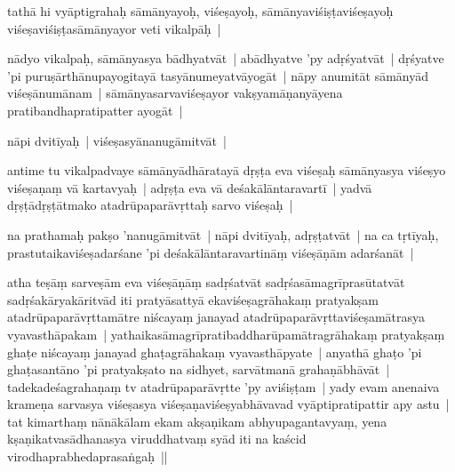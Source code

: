 \documentclass[article,12pt,a4paper]{memoir}%
\newcounter{parCount}
\begin{document}
	  
	  \pstart \leavevmode%
	\label{thakur75-73.25}tathā hi vyāptigrahaḥ sāmānyayoḥ, viśeṣayoḥ, sāmānyaviśiṣṭaviśeṣayoḥ viśeṣaviśiṣṭasāmānyayor veti vikalpāḥ |
	{}
	\pend%
      

	  
	  \pstart \leavevmode%
	\label{thakur75-73.27}nādyo vikalpaḥ, sāmānyasya bādhyatvāt | abādhyatve 'py adṛśyatvāt | dṛśyatve 'pi puruṣārthānupayogitayā tasyānumeyatvāyogāt | nāpy anumitāt sāmānyād viśeṣānumānam | sāmānyasarvaviśeṣayor vakṣyamāṇanyāyena pratibandhapratipatter ayogāt |
	{}
	\pend%
      

	  
	  \pstart \leavevmode%
	\label{thakur75-74.1}nāpi dvitīyaḥ | viśeṣasyānanugāmitvāt |
	{}
	\pend%
      

	  
	  \pstart \leavevmode%
	\label{thakur75-74.2}antime tu vikalpadvaye sāmānyādhāratayā dṛṣṭa eva viśeṣaḥ sāmānyasya viśeṣyo viśeṣaṇaṃ vā kartavyaḥ | adṛṣṭa eva vā deśakālāntaravartī | yadvā dṛṣṭādṛṣṭātmako atadrūpaparāvṛttaḥ sarvo viśeṣaḥ |
	{}
	\pend%
      

	  
	  \pstart \leavevmode%
	\label{thakur75-74.5}na prathamaḥ pakṣo 'nanugāmitvāt | nāpi dvitīyaḥ, adṛṣṭatvāt | na ca tṛtīyaḥ, prastutaikaviśeṣadarśane 'pi deśakālāntaravartināṃ viśeṣāṇām adarśanāt |
	{}
	\pend%
      

	  
	  \pstart \leavevmode%
	\label{thakur75-74.7}atha teṣāṃ sarveṣām eva viśeṣāṇāṃ sadṛśatvāt sadṛśasāmagrīprasūtatvāt sadṛśakāryakāritvād iti pratyāsattyā ekaviśeṣagrāhakaṃ pratyakṣam atadrūpaparāvṛttamātre niścayaṃ janayad atadrūpaparāvṛttaviśeṣamātrasya vyavasthāpakam |\label{thakur75-74.9} yathaikasāmagrīpratibaddharūpamātragrāhakaṃ pratyakṣaṃ ghaṭe niścayaṃ janayad ghaṭagrāhakaṃ vyavasthāpyate | anyathā ghaṭo 'pi ghaṭasantāno 'pi pratyakṣato na sidhyet, sarvātmanā grahaṇābhāvāt | \label{thakur75-74.12} tadekadeśagrahaṇaṃ tv atadrūpaparāvṛtte 'py aviśiṣṭam | yady evam anenaiva krameṇa sarvasya viśeṣasya viśeṣaṇaviśeṣyabhāvavad vyāptipratipattir apy astu | \label{thakur75-74.13} tat kimarthaṃ nānākālam ekam akṣaṇikam abhyupagantavyaṃ, yena kṣaṇikatvasādhanasya viruddhatvaṃ syād iti na kaścid virodhaprabhedaprasaṅgaḥ ||
	{}
	\pend%
      
\end{document}
